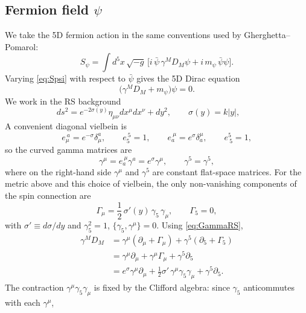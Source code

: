 \documentclass[11pt]{article}
\begin{document}
\subsection{Fermion field $\psi$}

We take the 5D fermion action in the same conventions used by Gherghetta--Pomarol:
\begin{equation}
S_\psi
= \int d^5x\,\sqrt{-g}\,\Big[
i\,\bar\psi\,\gamma^{M}D_{M}\psi
+ i\,m_\psi\,\bar\psi\psi
\Big] .
\label{eq:Spsi}
\end{equation}
Varying \eqref{eq:Spsi} with respect to $\bar\psi$ gives the 5D Dirac equation
\begin{equation}
\Big(\gamma^M D_M + m_\psi\Big)\psi = 0 .
\end{equation}
We work in the RS background
\begin{equation}
ds^2 = e^{-2\sigma(y)}\eta_{\mu\nu}dx^\mu dx^\nu + dy^2,
\qquad
\sigma(y)=k|y|,
\qquad
\end{equation}
A convenient diagonal vielbein is
\begin{equation}
e_\mu^{\ a}=e^{-\sigma}\delta_\mu^{a},
\qquad
e_5^{\ 5}=1,
\qquad
e_a^{\ \mu}=e^{\sigma}\delta_a^{\mu},
\qquad
e^5_{\ 5}=1,
\end{equation}
so the curved gamma matrices are
\begin{equation}
\gamma^\mu = e_a^{\ \mu}\gamma^a = e^{\sigma}\gamma^\mu,
\qquad
\gamma^5 = \gamma^5,
\end{equation}
where on the right-hand side $\gamma^\mu$ and $\gamma^5$ are constant flat-space matrices. For the metric above and this choice of vielbein, the only non-vanishing components of the spin connection are
\begin{equation}
\Gamma_\mu = \frac{1}{2}\,\sigma'(y)\,\gamma_5\,\gamma_\mu,
\qquad
\Gamma_5 = 0,
\label{eq:GammaRS}
\end{equation}
with $\sigma' \equiv d\sigma/dy$ and $\gamma_5^2=1$, $\{\gamma_5,\gamma^\mu\}=0$.
Using \eqref{eq:GammaRS},
\begin{align}
\gamma^M D_M
&= \gamma^\mu(\partial_\mu+\Gamma_\mu) + \gamma^5(\partial_5+\Gamma_5)\nonumber\\
&= \gamma^\mu\partial_\mu + \gamma^\mu\Gamma_\mu + \gamma^5\partial_5 \nonumber\\
&= e^{\sigma}\gamma^\mu\partial_\mu
+ \frac{1}{2}\sigma'\,\gamma^\mu\gamma_5\gamma_\mu
+ \gamma^5\partial_5 .
\label{eq:DiracOpStep}
\end{align}
The contraction $\gamma^\mu\gamma_5\gamma_\mu$ is fixed by the Clifford algebra: since $\gamma_5$ anticommutes with each $\gamma^\mu$,
\end{document}
